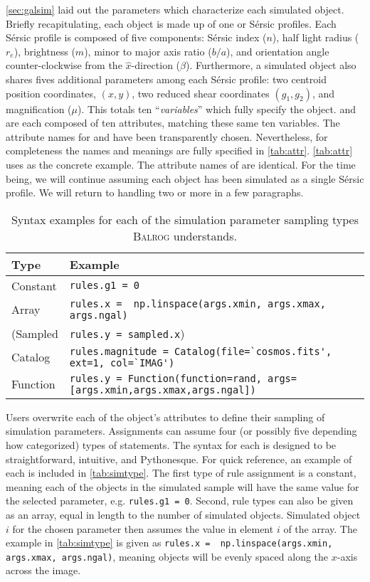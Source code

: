 \documentclass[11pt]{book}
\newcommand{\codett}[1]{\lstinline{#1}}
\newcommand{\py}{Python}
\newcommand{\balrog}{\textsc{Balrog}}
\newcommand{\sersic}{S\'{e}rsic}
\begin{document}
\autoref{sec:galsim} laid out the parameters which characterize each simulated object.
Briefly recapitulating, each object is made up of one or \sersic{} profiles.
Each \sersic{} profile is composed of five components: 
\sersic{} index ($n$), half light radius ($r_e$), brightness ($m$), minor to major axis ratio ($b/a$), 
and orientation angle counter-clockwise from the $\hat{x}$-direction ($\beta$).
Furthermore, a simulated object also shares fives additional parameters among each \sersic{} profile:
two centroid position coordinates, $(x,y)$, two reduced shear coordinates $(g_1,g_2)$, and magnification ($\mu$).
This totals ten ``\emph{variables}'' which fully specify the object.
\simrules{} and \simsamp{} are each composed of ten attributes,
matching these same ten variables.
The attribute names for \simrules{} and \simsamp{} have been transparently chosen.
Nevertheless, for completeness the names and meanings are fully specified in \autoref{tab:attr}.
\autoref{tab:attr} uses \simrules{} as the concrete example.
The attribute names of \simsamp{} are identical. 
For the time being, we will continue assuming each object has been simulated as a single \sersic{} profile.
We will return to handling two or more in a few paragraphs.

\begin{table} 
\caption{Syntax examples for each of the simulation parameter sampling types \balrog{} understands.} \label{tab:simtype}
\begin{tabular} {l l}
\toprule %
\rowcolor{gray2} \textbf{Type} & \textbf{Example} \\ \midrule
Constant & \codett{rules.g1 = 0} \\
Array & \codett{rules.x =  np.linspace(args.xmin, args.xmax, args.ngal)} \\
(Sampled  & \codett{rules.y = sampled.x}) \\
Catalog & \codett{rules.magnitude = Catalog(file=`cosmos.fits', ext=1, col=`IMAG')} \\
Function & \codett{rules.y = Function(function=rand, args=[args.xmin,args.xmax,args.ngal])} \\ \bottomrule %
\end{tabular}
\end{table}

Users overwrite each of the \simrules{} object's attributes to define their sampling of simulation parameters.
Assignments can assume four (or possibly five depending how categorized) types of statements. 
The syntax for each is designed to be straightforward, intuitive, and \py{}esque.
For quick reference, an example of each is included in \autoref{tab:simtype}.
The first type of rule assignment is a constant, meaning each of the objects in the simulated sample
will have the same value for the selected parameter, e.g. \codett{rules.g1 = 0}.
Second, rule types can also be given as an array, equal in length to the number of simulated objects. 
Simulated object $i$ for the chosen parameter then assumes the value in element $i$ of the array.
The example in \autoref{tab:simtype} is given as \codett{rules.x =  np.linspace(args.xmin, args.xmax, args.ngal)},
meaning objects will be evenly spaced along the $x$-axis across the image.
\end{document}
